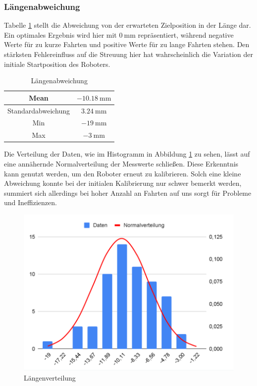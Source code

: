 \documentclass[ngerman]{tudscrreprt}
\begin{document}
\subsubsection{Längenabweichung}
Tabelle \ref{table:laengenabweichung} stellt die Abweichung von der erwarteten
Zielposition in der Länge dar. Ein optimales Ergebnis wird hier mit $\SI{0}{\mm}$
repräsentiert, während negative Werte für zu kurze Fahrten und positive Werte für zu
lange Fahrten stehen. Den stärksten Fehlereinfluss auf die Streuung hier hat
wahrscheinlich die Variation der initiale Startposition des Roboters.
%
\begin{table}[H]
    \centering
    \begin{tabular}{|c|c|}
    \hline
    Mean               & $\SI{-10,18}{\mm}$ \\ \hline
    Standardabweichung & $\SI{3,24}{\mm}$ \\ \hline
    Min                & $\SI{-19}{\mm}$ \\ \hline
    Max                & $\SI{-3}{\mm}$ \\ \hline
    \end{tabular}
    \caption{Längenabweichung}
    \label{table:laengenabweichung}
\end{table}
%
Die Verteilung der Daten, wie im Histogramm in Abbildung \ref{figure:laengenverteilung}
zu sehen, lässt auf eine annähernde Normalverteilung der Messwerte schließen. Diese
Erkenntnis kann genutzt werden, um den Roboter erneut zu kalibrieren. Solch eine kleine
Abweichung konnte bei der initialen Kalibrierung nur schwer bemerkt werden, summiert sich
allerdings bei hoher Anzahl an Fahrten auf uns sorgt für Probleme und Ineffizienzen.
%
\begin{figure}[H]
    \centering
    \includegraphics[scale=0.5]{src/charts/laengenverteilung.png}
    \caption{Längenverteilung}
    \label{figure:laengenverteilung}
\end{figure}
%
\end{document}
